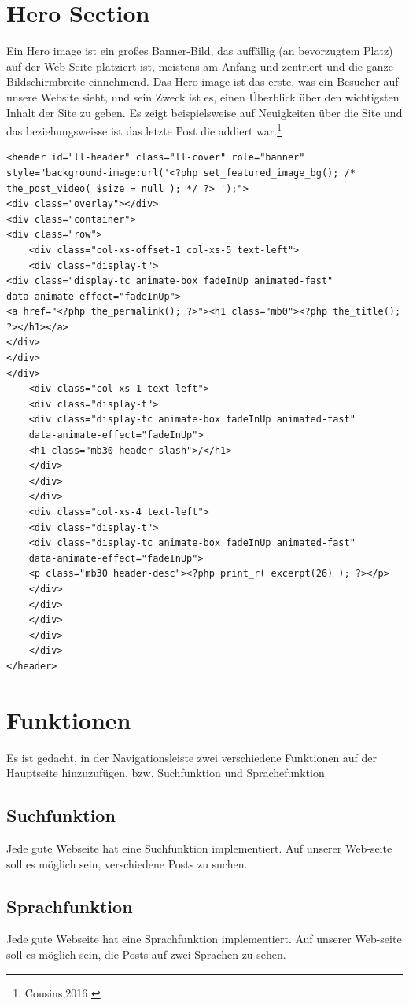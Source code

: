 \section{Hero Section}
Ein Hero image ist ein großes Banner-Bild, das auffällig (an bevorzugtem Platz) auf der Web-Seite platziert ist, meistens am Anfang und zentriert und die ganze Bildschirmbreite einnehmend.
Das Hero image ist das erste, was ein Besucher auf unsere Website sieht, und sein Zweck ist es, einen Überblick über den wichtigsten Inhalt der Site zu geben. Es zeigt beispielsweise auf Neuigkeiten über die Site und das beziehungsweisse ist das letzte Post die addiert war.\footnote{Cousins,2016 \cite{Cousins2016}}
\begin{verbatim}
<header id="ll-header" class="ll-cover" role="banner" 
style="background-image:url('<?php set_featured_image_bg(); /*
the_post_video( $size = null ); */ ?> ');">
<div class="overlay"></div>
<div class="container">
<div class="row">
	<div class="col-xs-offset-1 col-xs-5 text-left">
	<div class="display-t">
<div class="display-tc animate-box fadeInUp animated-fast" 
data-animate-effect="fadeInUp">
<a href="<?php the_permalink(); ?>"><h1 class="mb0"><?php the_title(); ?></h1></a>
</div>
</div>
</div>
	<div class="col-xs-1 text-left">
	<div class="display-t">
	<div class="display-tc animate-box fadeInUp animated-fast" 
    data-animate-effect="fadeInUp">
	<h1 class="mb30 header-slash">/</h1>
	</div>
	</div>
	</div>
	<div class="col-xs-4 text-left">
	<div class="display-t">
	<div class="display-tc animate-box fadeInUp animated-fast" 
    data-animate-effect="fadeInUp">
	<p class="mb30 header-desc"><?php print_r( excerpt(26) ); ?></p>
	</div>
	</div>
	</div>
	</div>
	</div>
</header>
\end{verbatim}

\newpage
\section{Funktionen}
Es ist gedacht, in der Navigationsleiste zwei verschiedene Funktionen auf der Hauptseite hinzuzufügen, bzw. Suchfunktion und Sprachefunktion
\subsection{Suchfunktion}
Jede gute Webseite hat eine Suchfunktion implementiert. Auf unserer Web-seite soll es möglich sein, verschiedene Posts zu suchen.
\subsection{Sprachfunktion}
Jede gute Webseite hat eine Sprachfunktion implementiert. Auf unserer Web-seite soll es möglich sein, die Posts auf zwei Sprachen zu sehen.
